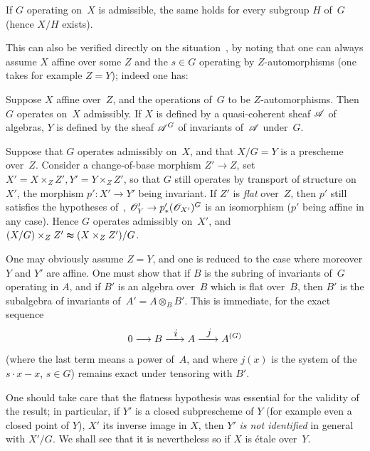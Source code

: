 \setcounter{subsection}{6}

\begin{corollary}
\label{cor:V.1.7}
If $G$ operating on~$X$ is admissible, the same holds for
every subgroup $H$ of~$G$ (hence $X/H$ exists).
\end{corollary}

This can also be verified directly on the
situation~, by noting that one can always assume $X$
affine over some $Z$ and the $s\in G$ operating by $Z$-automorphisms
(one takes for example $Z=Y$); indeed one has:

\begin{corollary}
\label{cor:V.1.8}
Suppose $X$ affine over~$Z$, and the operations of~$G$ to be
$Z$-auto\-mor\-phisms. Then $G$ operates on~$X$
admissibly. If $X$ is defined by a quasi-coherent sheaf
$\cal{A}$ of algebras, $Y$ is defined by the sheaf
$\cal{A}^G$ of invariants of~$\cal{A}$ under~$G$.
\end{corollary}

\begin{proposition}
\label{V.1.9}
Suppose that $G$ operates admissibly on~$X$, and that
$X/G=Y$ is a prescheme over~$Z$. Consider a
change-of-base morphism $Z'\to Z$, set $X'=X\times_Z Z',
Y'=Y\times_Z Z'$, so that $G$ still operates by transport of
structure on~$X'$, the morphism $p'\colon X'\to Y'$ being
invariant. If $Z'$ is \emph{flat} over~$Z$, then $p'$ still satisfies
the hypotheses
of~,
\ie $\cal{O}_Y'\to
p_*'(\cal{O}_{X'})^G$ is an isomorphism ($p'$ being affine in any
case). Hence $G$ operates admissibly on~$X'$, and $(X/G)\times_Z Z'\thickapprox (X\times_Z Z')/G$.
\end{proposition}

One may obviously assume $Z=Y$, and one is reduced to the case where
moreover $Y$ and $Y'$ are affine. One must show that if $B$ is the
subring of invariants of~$G$ operating in $A$, and if $B'$ is
an algebra over~$B$ which is flat over~$B$, then $B'$ is the
subalgebra of invariants of~$A'=A\otimes_B B'$. This is
immediate, for the exact sequence
$$
0 \to B \lto{i} A \lto{j} A^{(G)}
$$
(where the last term means a power of~$A$, and where
$j(x)$ is the system of the $s\cdot x-x$, $s\in G$) remains exact under
tensoring with
$B'$.

One should take care that the flatness hypothesis was
essential for the validity of the result; in particular, if
$Y'$ is a closed subprescheme of
$Y$
(for example even a closed point of
$Y$),
$X'$ its inverse image in $X$,
then $Y'$ \emph{is not identified} in general with
$X'/G$. We shall see that it is nevertheless so if $X$ is
\'etale over~$Y$.

